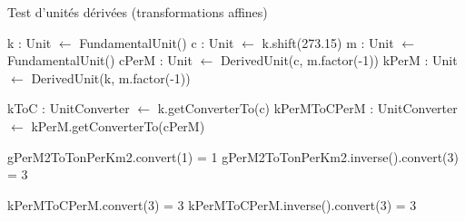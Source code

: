 \documentclass[a4paper,twoside,10pt]{article}
\begin{document}
\begin{algorithm}[!h]
\caption{Test d'unités dérivées (transformations affines)}\label{affineDerivedTest}
\begin{algorithmic}

\State k : Unit $\gets$ FundamentalUnit()
\State c : Unit $\gets$ k.shift(273.15)
\State m : Unit $\gets$ FundamentalUnit()
\State cPerM : Unit $\gets$ DerivedUnit(c, m.factor(-1))
\State kPerM : Unit $\gets$ DerivedUnit(k, m.factor(-1))

\State kToC : UnitConverter $\gets$ k.getConverterTo(c)
\State kPerMToCPerM : UnitConverter $\gets$ kPerM.getConverterTo(cPerM)

\Require gPerM2ToTonPerKm2.convert(1) = 1
\Require gPerM2ToTonPerKm2.inverse().convert(3) = 3

\Require kPerMToCPerM.convert(3) = 3
\Require kPerMToCPerM.inverse().convert(3) = 3
\EndProcedure
\end{algorithmic}
\end{algorithm}
\end{document}
